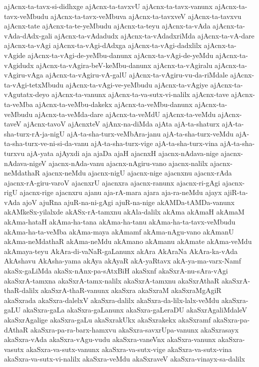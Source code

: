 {ajAcnx-ta-tavx-si-didhxge
ajAcnx-ta-tavxvU
ajAcnx-ta-tavx-vanunx
ajAcnx-ta-tavx-veMbudu
ajAcnx-ta-tavx-veMbuva
ajAcnx-ta-tavxveV
ajAcnx-ta-tavxvu
ajAcnx-tate
ajAcnx-ta-te-yeMbudu
ajAcnx-ta-teyu
ajAcnx-ta-vAda
ajAcnx-ta-vAda-dAdx-gali
ajAcnx-ta-vAdadudx
ajAcnx-ta-vAdadxriMda
ajAcnx-ta-vA-dare
ajAcnx-ta-vAgi
ajAcnx-ta-vAgi-dAdxga
ajAcnx-ta-vAgi-dadxlilx
ajAcnx-ta-vAgide
ajAcnx-ta-vAgi-de-yeMbu-danunx
ajAcnx-ta-vAgi-de-yeMdu
ajAcnx-ta-vAgidudx
ajAcnx-ta-vAgira-beV-keMbu-danunx
ajAcnx-ta-vAgiralu
ajAcnx-ta-vAgiru-vAga
ajAcnx-ta-vAgiru-vA-galU
ajAcnx-ta-vAgiru-vu-da-riMdale
ajAcnx-ta-vAgi-tetxMbudu
ajAcnx-ta-vAgi-ve-yeMbudu
ajAcnx-ta-vAgiye
ajAcnx-ta-vAgutatx-deyo
ajAcnx-ta-vanunx
ajAcnx-ta-va-sutx-vi-nalilx
ajAcnx-tave
ajAcnx-ta-veMba
ajAcnx-ta-veMbu-dakekx
ajAcnx-ta-veMbu-danunx
ajAcnx-ta-veMbudu
ajAcnx-ta-veMda-dare
ajAcnx-ta-veMdU
ajAcnx-ta-veMdu
ajAcnx-taveV
ajAcnx-tavoV
ajAcnxteV
ajAnx-na-diMda
ajAta
ajA-ta-shaturx
ajA-ta-sha-turx-rA-ja-nigU
ajA-ta-sha-turx-veMbAra-janu
ajA-ta-sha-turx-veMdu
ajA-ta-sha-turx-ve-ni-si-da-vanu
ajA-ta-sha-turx-vige
ajA-ta-sha-turx-vina
ajA-ta-sha-turxvu
ajA-yata
ajAyxdi
aja
ajaDa
ajaH
ajacnxH
ajacnx-nAdava-nige
ajacnx-nAdava-nigeV
ajacnx-nAda-vanu
ajacnx-nAgiru-vano
ajacnx-nalilx
ajacnx-neMdathaR
ajacnx-neMdu
ajacnx-nigU
ajacnx-nige
ajacnxnu
ajacnx-rAda
ajacnx-rA-giru-varoV
ajacnxrU
ajacnxra
ajacnx-ranunx
ajacnx-ri-gAgi
ajacnx-rigU
ajacnx-rige
ajacnxru
ajanu
aja-rA-mara
ajara
aja-ra-neMdu
ajayx
ajiR-ta-vAda
ajoV
ajuRna
ajuR-na-ni-gAgi
ajuR-na-nige
akAMDa-tAMDa-vanunx
akAMkeSx-yilalxde
akASx-rA-tamxnu
akAla-dalilx
akAma
akAmaH
akAmaM
akAma-hataH
akAma-ha-tana
akAma-ha-tanu
akAma-ha-ta-tavx-veMbudu
akAma-ha-ta-veMba
akAma-maya
akAmamf
akAma-nAgu-vano
akAmanU
akAma-neMdathaR
akAma-neMdu
akAmano
akAmanu
akAmate
akAma-veMdu
akAmaya-teyu
AkAra-di-vaNaR-gaLanunx
akAra
AkAraNa
AkAra-ka-vAda
AkAshavu
AkAsha-yama
akAya
akAyaR
akA-yaRtavx
akA-ya-ma-varx-Namf
akaSx-gaLiMda
akaSx-nAnx-pa-sAtxBiH
akaSxnf
akaSxrA-nu-sAra-vAgi
akaSxrA-tamxna
akaSxrA-tamx-nalilx
akaSxrA-tamxnu
akaSxrAthaR
akaSxrA-thaR-dalilx
akaSxrA-thaR-vanunx
akaSxra
akaSxraM
akaSxraMgAgiR
akaSxrada
akaSxra-dalelxV
akaSxra-dalilx
akaSxra-da-lilx-lalx-veMdu
akaSxra-gaLU
akaSxra-gaLa
akaSxra-gaLanunx
akaSxra-gaLeraDU
akaSxrAgaliMdaleV
akaSxrAgalige
akaSxra-gaLu
akaSxrakUkx
akaSxrakekx
akaSxramf
akaSxra-pa-dAthaR
akaSxra-pa-ra-barx-hamxvu
akaSxra-savxrUpa-vanunx
akaSxrasayx
akaSxra-vAda
akaSxra-vAgu-vudu
akaSxra-vaneVnx
akaSxra-vanunx
akaSxra-vasutx
akaSxra-va-sutx-vanunx
akaSxra-va-sutx-vige
akaSxra-va-sutx-vina
akaSxra-va-sutx-vi-nalilx
akaSxra-veMdu
akaSxraveV
akaSxra-vinayx-sa-dalilx
}
